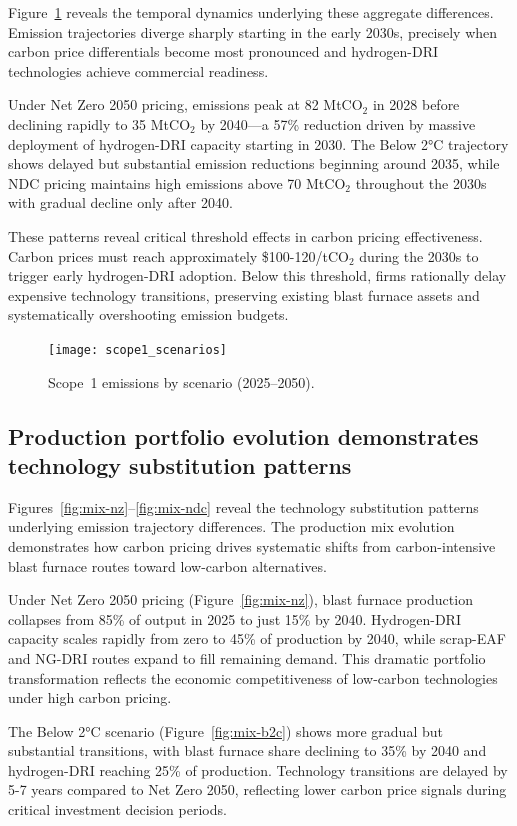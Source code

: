 \documentclass[preprint,1p,authoryear]{elsarticle}
\begin{document}
Figure~\ref{fig:scope1-scenarios} reveals the temporal dynamics underlying these aggregate differences. Emission trajectories diverge sharply starting in the early 2030s, precisely when carbon price differentials become most pronounced and hydrogen-DRI technologies achieve commercial readiness.

Under Net Zero 2050 pricing, emissions peak at 82 MtCO$_2$ in 2028 before declining rapidly to 35 MtCO$_2$ by 2040—a 57\% reduction driven by massive deployment of hydrogen-DRI capacity starting in 2030. The Below 2°C trajectory shows delayed but substantial emission reductions beginning around 2035, while NDC pricing maintains high emissions above 70 MtCO$_2$ throughout the 2030s with gradual decline only after 2040.

These patterns reveal critical threshold effects in carbon pricing effectiveness. Carbon prices must reach approximately \$100-120/tCO$_2$ during the 2030s to trigger early hydrogen-DRI adoption. Below this threshold, firms rationally delay expensive technology transitions, preserving existing blast furnace assets and systematically overshooting emission budgets.

\begin{figure}[!t]
  \centering
  \texttt{[image: scope1\_scenarios]}
  \caption{Scope~1 emissions by scenario (2025--2050).}
  \label{fig:scope1-scenarios}
\end{figure}

\subsection{Production portfolio evolution demonstrates technology substitution patterns}

Figures~\ref{fig:mix-nz}--\ref{fig:mix-ndc} reveal the technology substitution patterns underlying emission trajectory differences. The production mix evolution demonstrates how carbon pricing drives systematic shifts from carbon-intensive blast furnace routes toward low-carbon alternatives.

Under Net Zero 2050 pricing (Figure~\ref{fig:mix-nz}), blast furnace production collapses from 85\% of output in 2025 to just 15\% by 2040. Hydrogen-DRI capacity scales rapidly from zero to 45\% of production by 2040, while scrap-EAF and NG-DRI routes expand to fill remaining demand. This dramatic portfolio transformation reflects the economic competitiveness of low-carbon technologies under high carbon pricing.

The Below 2°C scenario (Figure~\ref{fig:mix-b2c}) shows more gradual but substantial transitions, with blast furnace share declining to 35\% by 2040 and hydrogen-DRI reaching 25\% of production. Technology transitions are delayed by 5-7 years compared to Net Zero 2050, reflecting lower carbon price signals during critical investment decision periods.
\end{document}
